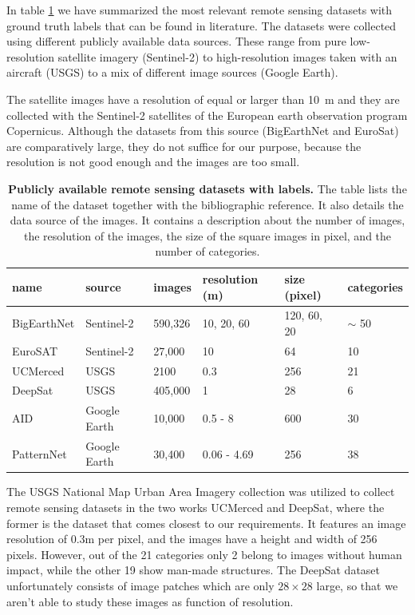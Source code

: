 In table \ref{table:datasets} we have summarized the most relevant remote sensing datasets with ground truth labels that can be found in literature. The datasets were collected using different publicly available data sources. These range from pure low-resolution satellite imagery (Sentinel-2) to high-resolution images taken with an aircraft (USGS) to a mix of different image sources (Google Earth). 

The satellite images have a resolution of equal or larger than 10~m and they are collected with the Sentinel-2 satellites of the European earth observation program Copernicus. Although the datasets from this source (BigEarthNet and EuroSat) are comparatively large, they do not suffice for our purpose, because the resolution is not good enough and the images are too small.

\begin{table}[h!]
	\begin{tabular}{l | l | l | l | l | l }
	name & source & images & resolution (m) & size (pixel) & categories \\
	\hline
	BigEarthNet \parencite{sumbul2019} & Sentinel-2 & 590,326 & 10, 20, 60 & 120, 60, 20 & $\sim$ 50 \\
	EuroSAT \parencite{helber2017}	& Sentinel-2 & 27,000  & 10 & 64  & 10 \\
	UCMerced \parencite{yang2010} & USGS & 2100 & 0.3 & 256 & 21 \\
	DeepSat \parencite{basu2015}  & USGS  & 405,000 & 1 & 28 & 6  \\
	AID \parencite{xia2016} & Google Earth & 10,000  & 0.5 - 8  & 600 & 30 \\
	PatternNet \parencite{zhou2017} & Google Earth & 30,400 & 0.06 - 4.69 & 256 & 38 \\
	\end{tabular}
	\captionsetup{width=1\linewidth}
	\caption{\textbf{Publicly available remote sensing datasets with labels.} The table  lists the name of the dataset together with the bibliographic reference. It also details the data source of the images. It contains a description about the number of images, the resolution of the images, the size of the square images in pixel, and the number of categories.}
	\label{table:datasets}	
\end{table}

The USGS National Map Urban Area Imagery collection \parencite{usgs} was utilized to collect remote sensing datasets in the two works UCMerced and DeepSat, where the former is the dataset that comes closest to our requirements. It features an image resolution of 0.3m per pixel, and the images have a height and width of 256 pixels. However, out of the 21 categories only 2 belong to images without human impact, while the other 19 show man-made structures. The DeepSat dataset unfortunately consists of image patches which are only $28 \times 28$ large, so that we aren't able to study these images as function of resolution.

